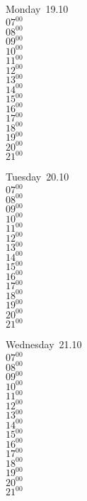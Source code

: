\documentclass[11pt,a4paper]{book}\usepackage[]{graphicx}\usepackage[]{color}
\begin{document}
\begin{headerbox}
\end{headerbox}
\begin{weekdaybox}
  Monday~19.10\\
  { 
  \vfill
  $07^{00}$\\
$08^{00}$\\
$09^{00}$\\
$10^{00}$\\
$11^{00}$\\
$12^{00}$\\
$13^{00}$\\
$14^{00}$\\
$15^{00}$\\
$16^{00}$\\
$17^{00}$\\
$18^{00}$\\
$19^{00}$\\
$20^{00}$\\
$21^{00}$\\
  }
\end{weekdaybox}
\begin{weekdaybox}
  Tuesday~20.10\\
  { 
  \vfill
  $07^{00}$\\
$08^{00}$\\
$09^{00}$\\
$10^{00}$\\
$11^{00}$\\
$12^{00}$\\
$13^{00}$\\
$14^{00}$\\
$15^{00}$\\
$16^{00}$\\
$17^{00}$\\
$18^{00}$\\
$19^{00}$\\
$20^{00}$\\
$21^{00}$\\
  }
\end{weekdaybox}
\begin{weekdaybox}
  Wednesday~21.10\\
  { 
  \vfill
  $07^{00}$\\
$08^{00}$\\
$09^{00}$\\
$10^{00}$\\
$11^{00}$\\
$12^{00}$\\
$13^{00}$\\
$14^{00}$\\
$15^{00}$\\
$16^{00}$\\
$17^{00}$\\
$18^{00}$\\
$19^{00}$\\
$20^{00}$\\
$21^{00}$\\
  }
\end{weekdaybox}
\end{document}
